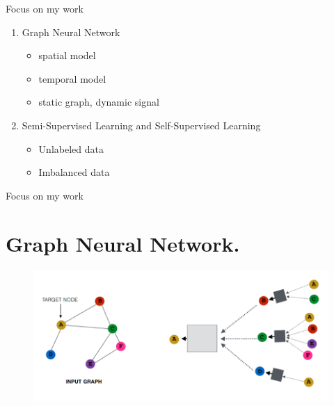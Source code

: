 \documentclass{beamer}
\begin{document}
	\begin{frame}[t]{Focus on my work}
		\begin{enumerate}
			\item Graph Neural Network
				\begin{itemize}
					\item spatial model
					\item temporal model
					\item static graph, dynamic signal
				\end{itemize}
			\item Semi-Supervised Learning and Self-Supervised Learning
				\begin{itemize}
					\item Unlabeled data
					\item Imbalanced data
				\end{itemize}
		\end{enumerate}
		
	\end{frame}
		\begin{frame}[t]{Focus on my work}
		\section{Graph Neural Network.}
		\begin{figure}
			\includegraphics[scale=0.3]{node.png}
		\end{figure}
	\end{frame}
\end{document}
